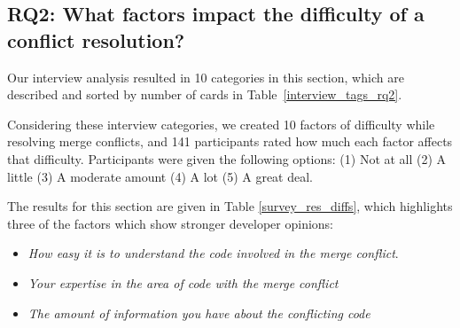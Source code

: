 \subsection{\textbf{RQ2:} What factors impact the difficulty of a conflict resolution?}\label{RQ2}

Our interview analysis resulted in 10 categories in this section, which are described and sorted by number of cards in Table~\ref{interview_tags_rq2}.

Considering these interview categories, we created 10 factors of difficulty while resolving merge conflicts, and 141 participants rated how much each factor affects that difficulty. Participants were given the following options:
(1) Not at all (2) A little (3) A moderate amount (4) A lot (5) A great deal.

The results for this section are given in Table \ref{survey_res_diffs}, which highlights three of the factors which show stronger developer opinions:
\begin{itemize}
\item \textit{How easy it is to understand the code involved in the merge conflict}. 
\item \textit{Your expertise in the area of code with the merge conflict}
\item \textit{The amount of information you have about the conflicting code} 
\end{itemize} 


